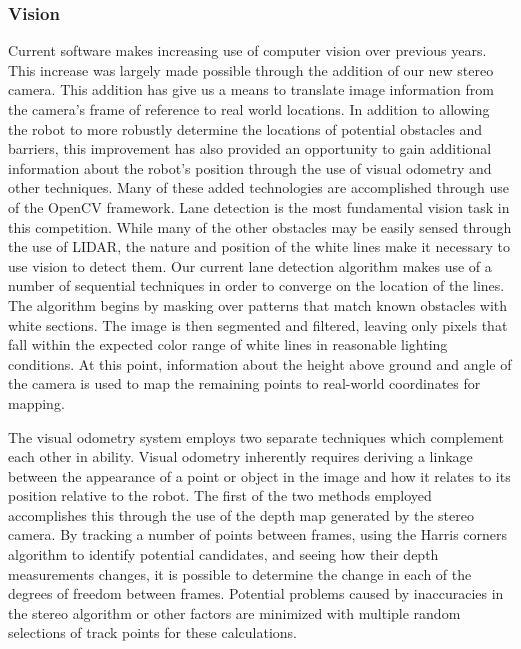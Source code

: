 \subsubsection{Vision}
Current software makes increasing use of computer vision over previous years. This increase was largely made possible through the addition of our new stereo camera. This addition has give us a means to translate image information from the camera's frame of reference to real world locations. In addition to allowing the robot to more robustly determine the locations of potential obstacles and barriers, this improvement has also provided an opportunity to gain additional information about the robot's position through the use of visual odometry and other techniques. Many of these added technologies are accomplished through use of the OpenCV framework.
Lane detection is the most fundamental vision task in this competition. While many of the other obstacles may be easily sensed through the use of LIDAR, the nature and position of the white lines make it necessary to use vision to detect them. Our current lane detection algorithm makes use of a number of sequential techniques in order to converge on the location of the lines. The algorithm begins by masking over patterns that match known obstacles with white sections. The image is then segmented and filtered, leaving only pixels that fall within the expected color range of white lines in reasonable lighting conditions. At this point, information about the height above ground and angle of the camera is used to map the remaining points to real-world coordinates for mapping.

The visual odometry system employs two separate techniques which complement each other in ability. Visual odometry inherently requires deriving a linkage between the appearance of a point or object in the image and how it relates to its position relative to the robot. The first of the two methods employed accomplishes this through the use of the depth map generated by the stereo camera. By tracking a number of points between frames, using the Harris corners algorithm to identify potential candidates, and seeing how their depth measurements changes, it is possible to determine the change in each of the degrees of freedom between frames. Potential problems caused by inaccuracies in the stereo algorithm or other factors are minimized with multiple random selections of track points for these calculations. 

